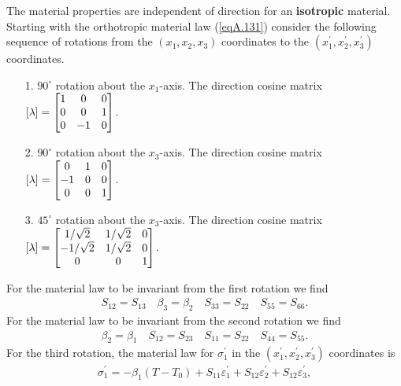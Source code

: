 \documentclass{AeroStructure-ERJohnson}
\begin{document}
The material properties are independent of direction for an \textbf{isotropic} material. Starting with the orthotropic material law (\ref{eqA.131}) consider the following sequence of rotations from the $(x_{1}, x_{2}, x_{3})$ coordinates to the $(x_{1}^{\prime}, x_{2}^{\prime}, x_{3}^{\prime})$ coordinates.
\begin{enumerate}[2.]
\item[\textrm{1.}] $90^{\circ}$ rotation about the $x_{1}$-axis. The direction cosine matrix $[\lambda]=\left[\begin{array}{@{}ccc@{}}1 & 0 & 0 \\0 & 0 & 1 \\0 & -1 & 0\end{array}\right]$.

\item[\textrm{2.}] $90^{\circ}$ rotation about the $x_{3}$-axis. The direction cosine matrix $[\lambda]=\left[\begin{array}{@{}ccc@{}}0 & 1 & 0 \\-1 & 0 & 0 \\0 & 0 & 1\end{array}\right]$.

\item[\textrm{3.}] $45^{\circ}$ rotation about the $x_{3}$-axis. The direction cosine matrix $[\lambda]=\left[\begin{array}{@{}ccc@{}}1 / \sqrt{2} & 1 / \sqrt{2} & 0 \\-1 / \sqrt{2} & 1 / \sqrt{2} & 0 \\0 & 0 & 1\end{array}\right]$.
\end{enumerate}
For the material law to be invariant from the first rotation we find
\begin{align}\label{eqA.132}
S_{12}=S_{13} \quad \beta_{3}=\beta_{2} \quad S_{33}=S_{22} \quad S_{55}=S_{66}.
\end{align}
For the material law to be invariant from the second rotation we find
\begin{align}\label{eqA.133}
\beta_{2}=\beta_{1} \quad S_{12}=S_{23} \quad S_{11}=S_{22} \quad S_{44}=S_{55}.
\end{align}
For the third rotation, the material law for $\sigma_{1}^{\prime}$ in the $(x_{1}^{\prime}, x_{2}^{\prime}, x_{3}^{\prime})$ coordinates is
\begin{align}\label{eqA.134}
\sigma_{1}^{\prime}=-\beta_{1}(T-T_{0})+S_{11} \varepsilon_{1}^{\prime}+S_{12} \varepsilon_{2}^{\prime}+S_{12} \varepsilon_{3}^{\prime},
\end{align}
\end{document}
